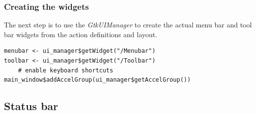 \documentclass[article]{jss}
\begin{document}

\subsubsection{Creating the widgets}

The next step is to use the \emph{GtkUIManager} to create the actual
menu bar and tool bar widgets from the action definitions and layout.
\begin{verbatim}
menubar <- ui_manager$getWidget("/Menubar")
toolbar <- ui_manager$getWidget("/Toolbar")
    # enable keyboard shortcuts 
main_window$addAccelGroup(ui_manager$getAccelGroup()) 
\end{verbatim}

\subsection{Status bar}
\end{document}
